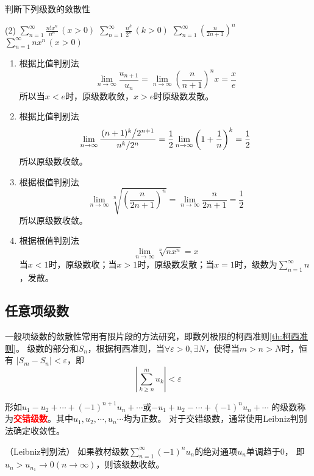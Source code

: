 \begin{example}
    判断下列级数的敛散性
    \begin{tasks}[label=(\arabic*),label-width = 2em](2)
        \task $\displaystyle \sum_{n=1}^\infty \frac{n!x^n}{n^n}\,(x>0)$
        \task $\displaystyle \sum_{n=1}^\infty \frac{n^k}{2^n}\,(k>0)$
        \task $\displaystyle \sum_{n=1}^\infty \left(\frac{n}{2n+1}\right)^n$
        \task $\displaystyle \sum_{n=1}^\infty nx^n\,(x>0)$
    \end{tasks}
\end{example}
\begin{solution}
    \begin{enumerate}[(1)]
        \item 根据比值判别法
              \[ \lim_{n\to\infty} \frac{u_{n+1}}{u_n} = \lim_{n\to\infty} \left(\frac{n}{n+1}\right)^{n}x = \frac{x}{e}\]
              所以当$x<e$时，原级数收敛，$x>e$时原级数发散。
        \item 根据比值判别法
              \[
                  \lim_{n\to\infty} \frac{\left.(n+1)^k\middle/2^{n+1}\right.}{\left.n^k\middle/2^{n}\right.}
                  =
                  \frac{1}{2}\lim_{n\to\infty} \left(1+\frac{1}{n}\right)^k
                  =
                  \frac{1}{2}
              \]
              所以原级数收敛。
        \item 根据根值判别法
              \[
                  \lim_{n\to\infty} \sqrt[n]{\left(\frac{n}{2n+1}\right)^n}
                  =
                  \lim_{n\to\infty} \frac{n}{2n+1}
                  =
                  \frac{1}{2}
              \]
              所以原级数收敛。
        \item 根据根值判别法
              \[ \lim_{n\to\infty} \sqrt[n]{nx^n} = x \]
              当$x<1$时，原级数收；当$x>1$时，原级数发散；当$x=1$时，级数为$\displaystyle\sum_{n=1}^\infty n$，发散。
    \end{enumerate}
\end{solution}

\subsection{任意项级数}
一般项级数的敛散性常用有限片段的方法研究，即数列极限的柯西准则\ref{th:柯西准则}。
级数的部分和$S_n$，根据柯西准则，当$\forall \varepsilon > 0,\exists N$，使得当$m>n>N$时，恒有
$|S_m-S_n|<\varepsilon$，即
\[ \left|\sum_{k\geq n}^m u_k \right|<\varepsilon \]


形如$u_1 - u_2 + \cdots + (-1)^{n+1}u_n + \cdots$或$-u_1 + u_2 - \cdots + (-1)^n u_n + \cdots$
的级数称为\textcolor{red}{\textbf{\textsf{交错级数}}}。其中$u_1,u_2,\cdots,u_n\cdots$均为正数。
对于交错级数，通常使用Leibniz判别法确定收敛性。
\begin{theorem}
    （Leibniz判别法）
    \label{th:Leibniz判别法}
    如果教材级数$\displaystyle\sum_{n=1}^\infty(-1)^n u_n$的绝对通项$u_n$单调趋于$0$，
    即$u_n>u_{n_1}\to 0(n\to\infty)$，则该级数收敛。
\end{theorem}

